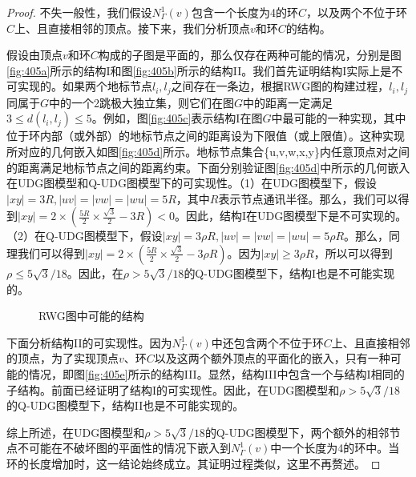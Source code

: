 \begin{proof}

不失一般性，我们假设$N_{\Gamma}^1(v)$包含一个长度为4的环$C$，以及两个不位于环$C$上、且直接相邻的顶点。接下来，我们分析顶点$v$和环$C$的结构。

假设由顶点$v$和环$C$构成的子图是平面的，那么仅存在两种可能的情况，分别是图\ref{fig:405a}所示的结构I和图\ref{fig:405b}所示的结构II。我们首先证明结构I实际上是不可实现的。如果两个地标节点$l_i,l_j$之间存在一条边，根据RWG图的构建过程，$l_i,l_j$同属于$G$中的一个2跳极大独立集，则它们在图$G$中的距离一定满足$3\le{d(l_i,l_j)}\le{5}$。例如，图\ref{fig:405c}表示结构I在图$G$中最可能的一种实现，其中位于环内部（或外部）的地标节点之间的距离设为下限值（或上限值）。这种实现所对应的几何嵌入如图\ref{fig:405d}所示。地标节点集合\{u,v,w,x,y\}内任意顶点对之间的距离满足地标节点之间的距离约束。下面分别验证图\ref{fig:405d}中所示的几何嵌入在UDG图模型和Q-UDG图模型下的可实现性。（1）在UDG图模型下，假设$|xy|=3R, |uv|=|vw|=|wu|=5R$，其中$R$表示节点通讯半径。那么，我们可以得到$|xy|=2\times(\frac{5R}{2}\times{\frac{\sqrt{3}}{2}}-3R)<0$。因此，结构I在UDG图模型下是不可实现的。（2）在Q-UDG图模型下，假设$|xy|=3\rho{R}, |uv|=|vw|=|wu|=5\rho{R}$。那么，同理我们可以得到$|xy|=2\times(\frac{5R}{2}\times{\frac{\sqrt{3}}{2}}-3\rho{R})$。因为$|xy|\ge3\rho{R}$，所以可以得到$\rho\le5\sqrt{3}/18$。因此，在$\rho>5\sqrt{3}/18$的Q-UDG图模型下，结构I也是不可能实现的。
\begin{figure}[t]
  \centering
  \caption{RWG图中可能的结构}
  \label{fig:405}
\end{figure}

下面分析结构II的可实现性。因为$N_{\Gamma}^1(v)$中还包含两个不位于环$C$上、且直接相邻的顶点，为了实现顶点$v$、环$C$以及这两个额外顶点的平面化的嵌入，只有一种可能的情况，即图\ref{fig:405e}所示的结构III。显然，结构III中包含一个与结构I相同的子结构。前面已经证明了结构I的可实现性。因此，在UDG图模型和$\rho>5\sqrt{3}/18$的Q-UDG图模型下，结构II也是不可能实现的。

综上所述，在UDG图模型和$\rho>5\sqrt{3}/18$的Q-UDG图模型下，两个额外的相邻节点不可能在不破坏图的平面性的情况下嵌入到$N_{\Gamma}^1(v)$中一个长度为4的环中。当环的长度增加时，这一结论始终成立。其证明过程类似，这里不再赘述。
\end{proof}

